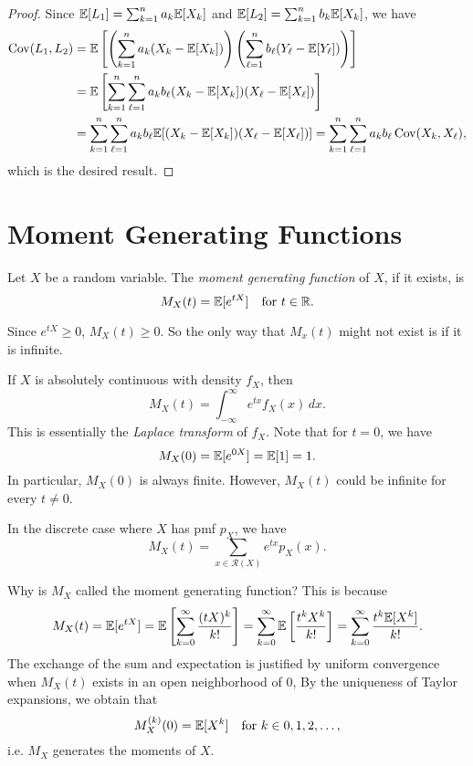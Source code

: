 \begin{proof}
  Since $\mathbb{E}[L_1] = \sum_{k = 1}^n a_k \mathbb{E}[X_k]$ and
  $\mathbb{E}[L_2] = \sum_{k = 1}^n b_k \mathbb{E}[X_k]$, we have
  \begin{align*}
    \operatorname{Cov}(L_1, L_2)
    &= \mathbb{E}\left[\left(\sum_{k = 1}^n a_k(X_k - \mathbb{E}[X_k]) \right)\left(\sum_{\ell = 1}^n b_\ell (Y_\ell - \mathbb{E}[Y_\ell])\right)\right] \\
    &= \mathbb{E}\left[\sum_{k = 1}^n \sum_{\ell = 1}^n a_k b_\ell (X_k - \mathbb{E}[X_k])(X_\ell - \mathbb{E}[X_\ell])\right] \\
    &= \sum_{k = 1}^n \sum_{\ell = 1}^n a_k b_\ell \mathbb{E}[(X_k - \mathbb{E}[X_k])(X_\ell - \mathbb{E}[X_\ell])]
    = \sum_{k = 1}^n \sum_{\ell = 1}^n a_k b_\ell \operatorname{Cov}(X_k, X_\ell),
  \end{align*}
  which is the desired result.
\end{proof}

\section{Moment Generating Functions}
\begin{definition}
  Let $X$ be a random variable. The
  \emph{moment generating function} of $X$, if it
  exists, is
  \[
    M_X(t) = \mathbb{E}[e^{tX}] \quad \text{for $t \in \mathbb{R}$}.
  \]
\end{definition}

\begin{remark}
  Since $e^{tX} \ge 0$,
  $M_X(t) \ge 0$.
  So the only way that $M_x(t)$ might not exist
  is if it is infinite.
\end{remark}

\begin{example}
  If $X$ is absolutely continuous with density
  $f_X$, then
  \[
    M_X(t) = \int_{-\infty}^\infty e^{tx} f_X(x) \, dx.
  \]
  This is essentially the \emph{Laplace transform}
  of $f_X$. Note that for $t = 0$, we have
  \[
    M_X(0)
    = \mathbb{E}[e^{0X}]
    = \mathbb{E}[1] = 1.
  \]
  In particular, $M_X(0)$ is always finite.
  However, $M_X(t)$ could be infinite for every
  $t \ne 0$.
\end{example}

\begin{example}
  In the discrete case where $X$ has pmf $p_X$, we
  have
  \[
    M_X(t) = \sum_{x \in \mathcal{R}(X)} e^{tx} p_X(x).
  \]
\end{example}

\begin{remark}
  Why is $M_X$ called the moment generating
  function? This is because
  \[
    M_X(t) = \mathbb{E}[e^{tX}]
    = \mathbb{E}\left[\sum_{k = 0}^\infty \frac{(tX)^k}{k!}\right]
    = \sum_{k = 0}^\infty \mathbb{E}\left[\frac{t^k X^k}{k!}\right]
    = \sum_{k = 0}^\infty \frac{t^k \mathbb{E}[X^k]}{k!}.
  \]
  The exchange of the sum and expectation is justified
  by uniform convergence
  when $M_X(t)$ exists in an open neighborhood of $0$,
  By the uniqueness of Taylor expansions, we obtain
  that
  \[
    M_X^{(k)}(0) = \mathbb{E}[X^k] \quad \text{for $k \in 0, 1, 2, \dots$},
  \]
  i.e. $M_X$ generates the moments of $X$.
\end{remark}

